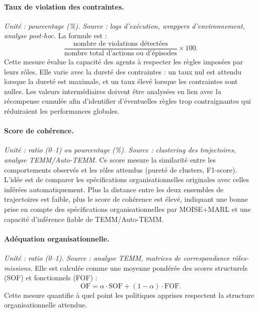 \paragraph{Taux de violation des contraintes.}
\textit{Unité : pourcentage (\%). Source : logs d’exécution, wrappers d’environnement, analyse post-hoc.}
La formule est :
\[
  \frac{\text{nombre de violations détectées}}{\text{nombre total d’actions ou d’épisodes}} \times 100.
\]
Cette mesure évalue la capacité des agents à respecter les règles imposées par leurs rôles.
Elle varie avec la dureté des contraintes : un taux nul est attendu lorsque la dureté est maximale, et un taux élevé lorsque les contraintes sont nulles.
Les valeurs intermédiaires doivent être analysées en lien avec la récompense cumulée afin d’identifier d’éventuelles règles trop contraignantes qui réduiraient les performances globales.

\paragraph{Score de cohérence.}
\textit{Unité : ratio (0–1) ou pourcentage (\%). Source : clustering des trajectoires, analyse TEMM/Auto-TEMM.}
Ce score mesure la similarité entre les comportements observés et les rôles attendus (pureté de clusters, F1-score).
L’idée est de comparer les spécifications organisationnelles originales avec celles inférées automatiquement.
Plus la distance entre les deux ensembles de trajectoires est faible, plus le score de cohérence est élevé, indiquant une bonne prise en compte des spécifications organisationnelles par MOISE+MARL et une capacité d’inférence fiable de TEMM/Auto-TEMM.

\paragraph{Adéquation organisationnelle.}
\textit{Unité : ratio (0–1). Source : analyse TEMM, matrices de correspondance rôles-missions.}
Elle est calculée comme une moyenne pondérée des scores structurels (SOF) et fonctionnels (FOF) :
\[
  \text{OF} = \alpha \cdot \text{SOF} + (1-\alpha) \cdot \text{FOF}.
\]
Cette mesure quantifie à quel point les politiques apprises respectent la structure organisationnelle attendue.


